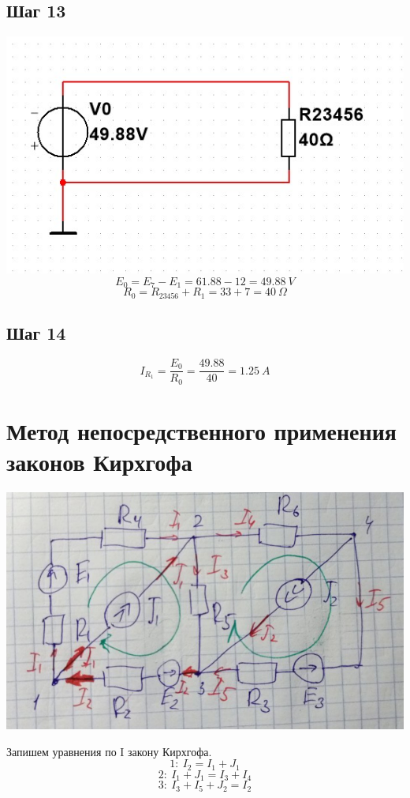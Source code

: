 \documentclass[14pt, a4paper]{article}
\begin{document}
    \subsection*{Шаг 13}
    \includegraphics[width=1\textwidth]{Stage13.jpg}
    $$E_0 = E_7 - E_1 = 61.88 - 12 = 49.88 \ V$$
    $$R_0 = R_{23456} + R_1 = 33 + 7 = 40 \ \Omega$$

    \subsection*{Шаг 14}
    $$I_{R_1} = \frac{E_0}{R_0} = \frac{49.88}{40} = 1.25 \ A$$

\section*{Метод непосредственного применения законов Кирхгофа}

\includegraphics[width=1\textwidth]{kirh.jpg}

    Запишем уравнения по I закону Кирхгофа.
    $$1: \ I_2 = I_1 + J_1$$
    $$2: \ I_1 + J_1 = I_3 + I_4$$
    $$3: \ I_3 + I_5 + J_2 = I_2$$
\end{document}
